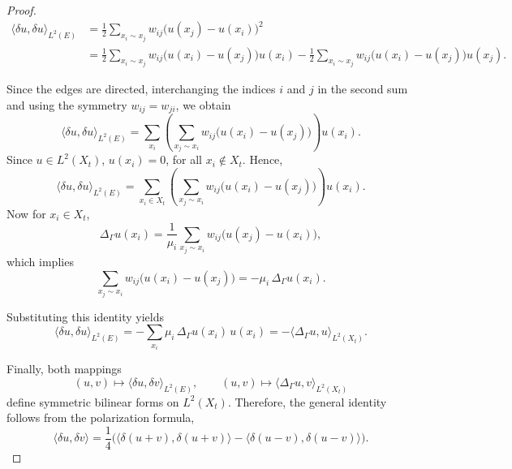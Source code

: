 \documentclass[10pt,a4paper]{amsart}
\begin{document}
\begin{proof}

\begin{align*}
\langle \delta u, \delta u \rangle_{L^2(E)}
&=
\frac{1}{2}\sum_{x_i\sim x_j}
w_{ij}\bigl(u(x_j)-u(x_i)\bigr)^2 \\
&=
\frac{1}{2}\sum_{x_i\sim x_j}
w_{ij}\bigl(u(x_i)-u(x_j)\bigr)u(x_i)
-
\frac{1}{2}\sum_{x_i\sim x_j}
w_{ij}\bigl(u(x_i)-u(x_j)\bigr)u(x_j).
\end{align*}

Since the edges are directed, interchanging the indices $i$ and $j$ in the second sum and using the symmetry
$w_{ij}=w_{ji}$, we obtain
\[
\langle \delta u, \delta u \rangle_{L^2(E)}
=
\sum_{x_i}
\left(
\sum_{x_j\sim x_i}
w_{ij}\bigl(u(x_i)-u(x_j)\bigr)
\right)
u(x_i).
\]
Since $u\in L^2(X_t)$, $u(x_i)=0$, for all $x_i\notin X_t.$ Hence, 
                            \[
\langle \delta u, \delta u \rangle_{L^2(E)}
=
\sum_{x_i\in X_t}
\left(
\sum_{x_j\sim x_i}
w_{ij}\bigl(u(x_i)-u(x_j)\bigr)
\right)
u(x_i).
\]
Now for $x_i\in X_t$,
\[
\Delta_\Gamma u(x_i)
=
\frac{1}{\mu_i}
\sum_{x_j\sim x_i}
w_{ij}\bigl(u(x_j)-u(x_i)\bigr),
\]
which implies
\[
\sum_{x_j\sim x_i}
w_{ij}\bigl(u(x_i)-u(x_j)\bigr)
=
-\mu_i\,\Delta_\Gamma u(x_i).
\]

Substituting this identity yields
\[
\langle \delta u, \delta u \rangle_{L^2(E)}
=
-\sum_{x_i}
\mu_i\,\Delta_\Gamma u(x_i)\,u(x_i)
=
-\langle \Delta_\Gamma u, u \rangle_{L^2(X_t)}.
\]

Finally, both mappings
\[
(u,v)\mapsto \langle \delta u,\delta v\rangle_{L^2(E)},
\qquad
(u,v)\mapsto \langle \Delta_\Gamma u,v\rangle_{L^2(X_t)}
\]
define symmetric bilinear forms on $L^2(X_t)$.
Therefore, the general identity follows from the polarization formula,
\[
\langle \delta u,\delta v\rangle
=
\frac14\bigl(
\langle \delta(u+v),\delta(u+v)\rangle
-
\langle \delta(u-v),\delta(u-v)\rangle
\bigr).
\]

\end{proof}
\end{document}
